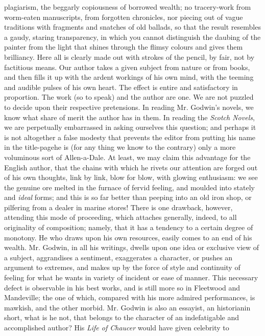 plagiarism, the beggarly copiousness of borrowed wealth; no
tracery-work from worm-eaten manuscripts, from forgotten
chronicles, nor piecing out of vague traditions with fragments and
snatches of old ballads, so that the result resembles a gaudy,
staring transparency, in which you cannot distinguish the daubing
of the painter from the light that shines through the flimsy
colours and gives them brilliancy. Here all is clearly made out
with strokes of the pencil, by fair, not by factitious means. Our
author takes a given subject from nature or from books, and then
fills it up with the ardent workings of his own mind, with the
teeming and audible pulses of his own heart. The effect is entire
and satisfactory in proportion. The work (so to speak) and the
author are one. We are not puzzled to decide upon their respective
pretensions. In reading Mr. Godwin's novels, we know what share of
merit the author has in them. In reading the \emph{Scotch Novels},
we are perpetually embarrassed in asking ourselves this question;
and perhaps it is not altogether a false modesty that prevents the
editor from putting his name in the title-page\textemdash he is
(for any thing we know to the contrary) only a more voluminous
sort of Allen-a-Dale.  At least, we may claim this advantage for
the English author, that the chains with which he rivets our
attention are forged out of his own thoughts, link by link, blow
for blow, with glowing enthusiasm: we see the genuine ore melted
in the furnace of fervid feeling, and moulded into stately and
\emph{ideal} forms; and this is so far better than peeping into an
old iron shop, or pilfering from a dealer in marine stores!  There
is one drawback, however, attending this mode of proceeding, which
attaches generally, indeed, to all originality of composition;
namely, that it has a tendency to a certain degree of monotony. He
who draws upon his own resources, easily comes to an end of his
wealth. Mr.  Godwin, in all his writings, dwells upon one idea or
exclusive view of a subject, aggrandises a sentiment, exaggerates
a character, or pushes an argument to extremes, and makes up by
the force of style and continuity of feeling for what he wants in
variety of incident or ease of manner.  This necessary defect is
observable in his best works, and is still more so in Fleetwood
and Mandeville; the one of which, compared with his more admired
performances, is mawkish, and the other morbid. Mr. Godwin is also
an essayist, an historian\textemdash in short, what is he not,
that belongs to the character of an indefatigable and accomplished
author? His \emph{Life of Chaucer} would have given celebrity to

